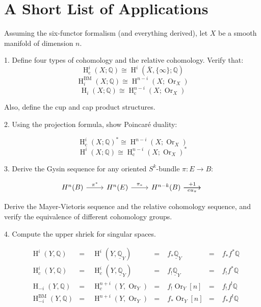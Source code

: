 \documentclass[UTF8]{amsart}
\numberwithin{equation}{section}
\theoremstyle{plain}
\numberwithin{equation}{section}
\theoremstyle{remark}
\DeclareMathOperator{\Hcohom}{\operatorname{H}}
\DeclareMathOperator{\BM}{\operatorname{BM}}
\DeclareMathOperator{\cpt}{\operatorname{c}}
\DeclareMathOperator{\Or}{\operatorname{Or}}
\begin{document}
\section{A Short List of Applications}

Assuming the six-functor formalism (and everything derived), let \( X \) be a smooth manifold of dimension \( n \).

1. Define four types of cohomology and the relative cohomology.
   Verify that:
$$\Hcohom^i_{\cpt}(X;\mathbb{Q}) \cong \Hcohom^i\left(\bar{X}, \{\infty \};\mathbb{Q}\right)$$
$$\Hcohom_i^{\BM}(X;\mathbb{Q}) \cong \Hcohom^{n-i}(X; \Or_X)$$
$$\Hcohom_i(X;\mathbb{Q}) \cong \Hcohom^{n-i}_{\cpt}(X; \Or_X)$$

   Also, define the cup and cap product structures.

2. Using the projection formula, show Poincaré duality:

$$\Hcohom^i_{\cpt}(X;\mathbb{Q})^* \cong \Hcohom^{n-i}(X; \Or_X)$$
$$\Hcohom^i(X;\mathbb{Q}) \cong \Hcohom^{n-i}_{\cpt}(X; \Or_X)^*$$


3. Derive the Gysin sequence for any oriented \( S^k \)-bundle \( \pi: E \longrightarrow B \):

\[\begin{tikzcd}
	{H^n(B)} & {H^n(E)} & {H^{n-k}(B)} & {}
	\arrow["{\pi^*}", from=1-1, to=1-2]
	\arrow["{\pi_*}", from=1-2, to=1-3]
	\arrow["{+1}", from=1-3, to=1-4]
	\arrow["{eu_{\pi}}"', from=1-3, to=1-4]
\end{tikzcd}\]

   Derive the Mayer-Vietoris sequence and the relative cohomology sequence, and verify the equivalence of different cohomology groups.

4. Compute the upper shriek for singular spaces.




\begin{equation*}
\begin{aligned}
  &\operatorname{H}^i(Y, \mathbb{Q}) &=\;& \operatorname{H}^i(Y, \underline{\mathbb{Q}}_Y)  &=\;& f_* \underline{\mathbb{Q}}_Y &=\;& f_* f^* \mathbb{Q}   \\ 
  &\operatorname{H}^i_c(Y, \mathbb{Q}) &=\;& \operatorname{H}^i_c(Y, \underline{\mathbb{Q}}_Y)  &=\;& f_! \underline{\mathbb{Q}}_Y &=\;& f_! f^* \mathbb{Q}   \\ 
  &\operatorname{H}_{-i}(Y, \mathbb{Q}) &=\;& \operatorname{H}^{n+i}_c(Y, \operatorname{Or}_Y)  &=\;& f_! \operatorname{Or}_Y[n] &=\;& f_! f^! \mathbb{Q}   \\ 
  &\operatorname{H}_{-i}^{\operatorname{BM}}(Y, \mathbb{Q}) &=\;& \operatorname{H}^{n+i}(Y, \operatorname{Or}_Y)  &=\;& f_* \operatorname{Or}_Y[n] &=\;& f_* f^! \mathbb{Q}   \\ 
\end{aligned}
\end{equation*}
\end{document}
